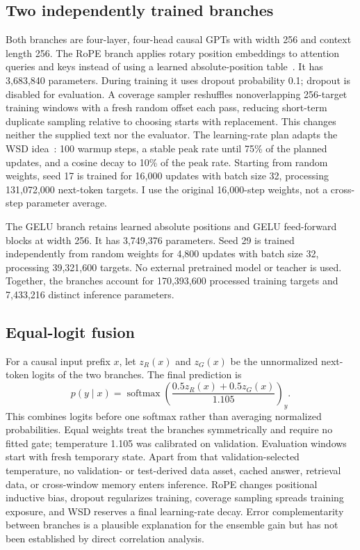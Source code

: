 \documentclass[10pt,a4paper]{article}
\begin{document}
\subsection{Two independently trained branches}
Both branches are four-layer, four-head causal GPTs with width 256 and context length 256. The RoPE branch applies rotary position embeddings to attention queries and keys instead of using a learned absolute-position table~\cite{roformer}. It has 3,683,840 parameters. During training it uses dropout probability 0.1; dropout is disabled for evaluation. A coverage sampler reshuffles nonoverlapping 256-target training windows with a fresh random offset each pass, reducing short-term duplicate sampling relative to choosing starts with replacement. This changes neither the supplied text nor the evaluator. The learning-rate plan adapts the WSD idea~\cite{minicpm}: 100 warmup steps, a stable peak rate until 75\% of the planned updates, and a cosine decay to 10\% of the peak rate. Starting from random weights, seed 17 is trained for 16,000 updates with batch size 32, processing 131,072,000 next-token targets. I use the original 16,000-step weights, not a cross-step parameter average.

The GELU branch retains learned absolute positions and GELU feed-forward blocks at width 256. It has 3,749,376 parameters. Seed 29 is trained independently from random weights for 4,800 updates with batch size 32, processing 39,321,600 targets. No external pretrained model or teacher is used. Together, the branches account for 170,393,600 processed training targets and 7,433,216 distinct inference parameters.

\subsection{Equal-logit fusion}
For a causal input prefix $x$, let $z_R(x)$ and $z_G(x)$ be the unnormalized next-token logits of the two branches. The final prediction is
\begin{equation}
 p(y\mid x)=\operatorname{softmax}\!\left(\frac{0.5z_R(x)+0.5z_G(x)}{1.105}\right)_y.
\end{equation}
This combines logits before one softmax rather than averaging normalized probabilities. Equal weights treat the branches symmetrically and require no fitted gate; temperature 1.105 was calibrated on validation. Evaluation windows start with fresh temporary state. Apart from that validation-selected temperature, no validation- or test-derived data asset, cached answer, retrieval data, or cross-window memory enters inference. RoPE changes positional inductive bias, dropout regularizes training, coverage sampling spreads training exposure, and WSD reserves a final learning-rate decay. Error complementarity between branches is a plausible explanation for the ensemble gain but has not been established by direct correlation analysis.
\end{document}

